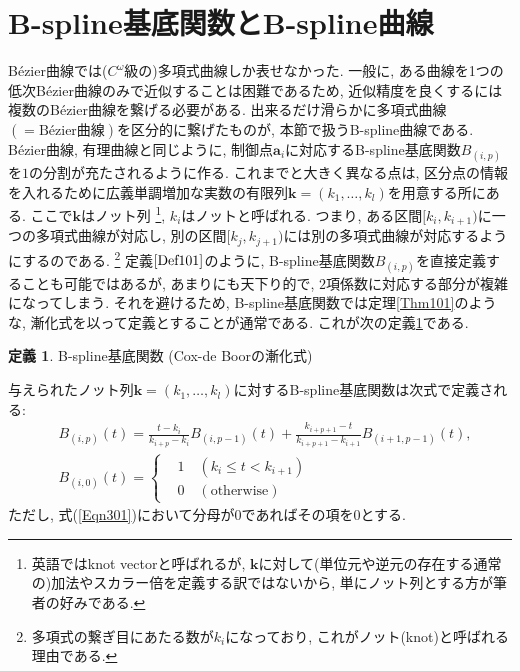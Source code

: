 \documentclass{jsarticle}
\theoremstyle{definition}%
\newtheorem{defn}[thm]{定義}
\begin{document}
\section{B-spline基底関数とB-spline曲線}
B\'ezier曲線では($C^\omega$級\footnotemark の)多項式曲線しか表せなかった.
一般に, ある曲線を1つの低次B\'ezier曲線のみで近似することは困難であるため, 近似精度を良くするには複数のB\'ezier曲線を繋げる必要がある.
出来るだけ滑らかに多項式曲線$(=\text{B\'ezier曲線})$を区分的に繋げたものが, 本節で扱うB-spline曲線である.
B\'ezier曲線, 有理曲線と同じように, 制御点$\bm{a}_i$に対応するB-spline基底関数$B_{(i,p)}$を$1$の分割が充たされるように作る.
これまでと大きく異なる点は, 区分点の情報を入れるために広義単調増加な実数の有限列$\bm{k}=(k_1, \dots , k_l)$を用意する所にある.
ここで$\bm{k}$はノット列%
\footnote{英語ではknot vectorと呼ばれるが, $\bm{k}$に対して(単位元や逆元の存在する通常の)加法やスカラー倍を定義する訳ではないから, 単にノット列とする方が筆者の好みである.
}, $k_{i}$はノットと呼ばれる.
つまり, ある区間$[k_{i}, k_{i+1})$に一つの多項式曲線が対応し, 別の区間$[k_{j}, k_{j+1})$には別の多項式曲線が対応するようにするのである.%
\footnote{多項式の繋ぎ目にあたる数が$k_{i}$になっており, これがノット(knot)と呼ばれる理由である.}
定義$\ref{Def101}$のように, B-spline基底関数$B_{(i,p)}$を直接定義することも可能ではあるが, あまりにも天下り的で, $2$項係数に対応する部分が複雑になってしまう.
それを避けるため, B-spline基底関数では定理\ref{Thm101}のような, 漸化式を以って定義とすることが通常である.
これが次の定義\ref{Def301}である.
\begin{screen}
	\begin{defn}
        \label{Def301}
		B-spline基底関数 (Cox-de Boorの漸化式)

		与えられたノット列$\bm{k}=(k_1, \dots , k_l)$に対するB-spline基底関数は次式で定義される:
		\begin{align}
			\label{Eqn301}
			&{B}_{(i,p)}(t)
			=
			\frac{t-k_{i}}{k_{i+p}-k_{i}}{B}_{(i,p-1)}(t)
			+\frac{k_{i+p+1}-t}{k_{i+p+1}-k_{i+1}}{B}_{(i+1,p-1)}(t), \\
			\label{Eqn302}
			&{B}_{(i,0)} (t)
			=
			\begin{cases}
				&1\quad (k_{i}\le t< k_{i+1})\\
				&0\quad (\text{otherwise})
			\end{cases}
		\end{align}
		ただし, 式(\ref{Eqn301})において分母が$0$であればその項を$0$とする.
	\end{defn}
\end{screen}
\end{document}
